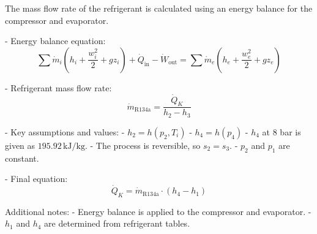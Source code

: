 The mass flow rate of the refrigerant is calculated using an energy balance for the compressor and evaporator.  

- Energy balance equation:  
  \[
  \sum \dot{m}_i \left( h_i + \frac{w_i^2}{2} + g z_i \right) + \dot{Q}_{\text{in}} - \dot{W}_{\text{out}} = \sum \dot{m}_e \left( h_e + \frac{w_e^2}{2} + g z_e \right)
  \]  

- Refrigerant mass flow rate:  
  \[
  \dot{m}_{\text{R134a}} = \frac{\dot{Q}_K}{h_2 - h_3}
  \]  

- Key assumptions and values:  
  - \( h_2 = h(p_2, T_i) \)  
  - \( h_4 = h(p_4) \)  
  - \( h_4 \) at 8 bar is given as \( 195.92 \, \text{kJ/kg} \).  
  - The process is reversible, so \( s_2 = s_3 \).  
  - \( p_2 \) and \( p_1 \) are constant.  

- Final equation:  
  \[
  \dot{Q}_K = \dot{m}_{\text{R134a}} \cdot (h_4 - h_1)
  \]  

Additional notes:  
- Energy balance is applied to the compressor and evaporator.  
- \( h_1 \) and \( h_4 \) are determined from refrigerant tables.